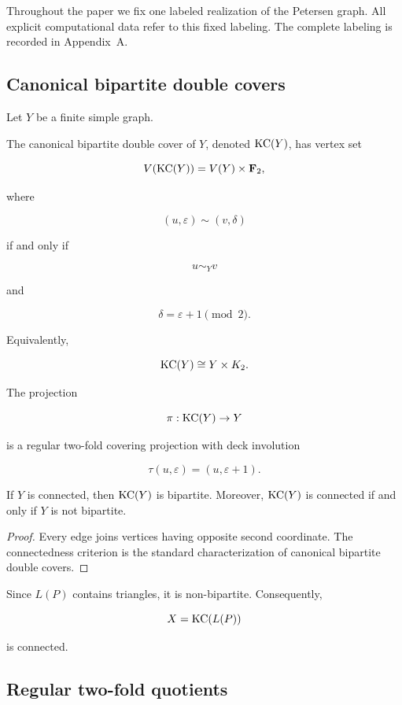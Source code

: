 Throughout the paper we fix one labeled realization of the Petersen graph.
All explicit computational data refer to this fixed labeling. The complete
labeling is recorded in Appendix~A.

\subsection{Canonical bipartite double covers}

Let \(Y\) be a finite simple graph.

The canonical bipartite double cover of \(Y\), denoted
\(\operatorname{KC}(Y)\), has vertex set

\[
V(\operatorname{KC}(Y))
=
V(Y)\times\mathbf F_2,
\]

where

\[
(u,\varepsilon)
\sim
(v,\delta)
\]

if and only if

\[
u\sim_Y v
\]

and

\[
\delta=\varepsilon+1
\pmod2.
\]

Equivalently,

\[
\operatorname{KC}(Y)\cong Y\times K_2.
\]

The projection

\[
\pi:\operatorname{KC}(Y)\rightarrow Y
\]

is a regular two-fold covering projection with deck involution

\[
\tau(u,\varepsilon)
=
(u,\varepsilon+1).
\]

\begin{proposition}
If \(Y\) is connected, then \(\operatorname{KC}(Y)\) is bipartite.
Moreover, \(\operatorname{KC}(Y)\) is connected if and only if \(Y\) is not bipartite.
\end{proposition}

\begin{proof}
Every edge joins vertices having opposite second coordinate.
The connectedness criterion is the standard characterization of canonical
bipartite double covers.
\end{proof}

Since \(L(P)\) contains triangles, it is non-bipartite.
Consequently,

\[
X=\operatorname{KC}(L(P))
\]

is connected.

\subsection{Regular two-fold quotients}

